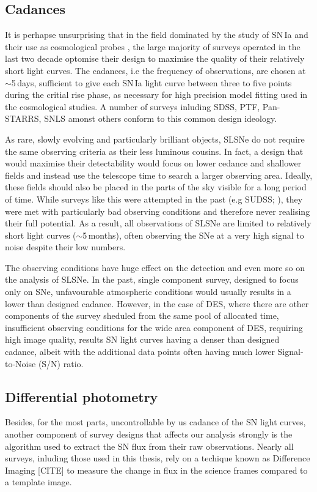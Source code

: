 \subsection{Cadances}
It is perhapse unsurprising that in the field dominated by the study of SN\,Ia and their use as cosmological probes \citep{Perlmutter1997,Riess1998}, the large majority of surveys operated in the last two decade optomise their design to maximise the quality of their relatively short light curves. The cadances, i.e the frequency of observations, are chosen at $\sim$5\,days, sufficient to give each SN\,Ia light curve between three to five points during the critial rise phase, as necessary for high precision model fitting used in the cosmological studies. A number of surveys inluding SDSS, PTF, Pan-STARRS, SNLS amonst others conform to this common design ideology.

As rare, slowly evolving and particularly brilliant objects, SLSNe do not require the same observing criteria as their less luminous cousins. In fact, a design that would maximise their detectability would focus on lower cedance and shallower fields and instead use the telescope time to search a larger observing area. Ideally, these fields should also be placed in the parts of the sky visible for a long period of time. While surveys like this were attempted in the past (e.g SUDSS; ), they were met with particularly bad observing conditions and therefore never realising their full potential. As a result, all observations of SLSNe are limited to relatively short light curves ($\sim$5\,months), often observing the SNe at a very high signal to noise despite their low numbers.

The observing conditions have huge effect on the detection and even more so on the analysis of SLSNe. In the past, single component survey, designed to focus only on SNe, unfavourable atmospheric conditions would usually results in a lower than designed cadance. However, in the case of DES, where there are other components of the survey sheduled from the same pool of allocated time, insufficient observing conditions for the wide area component of DES, requiring high image quality, results SN light curves having a denser than designed cadance, albeit with the additional data points often having much lower Signal-to-Noise (S/N) ratio.

\subsection{Differential photometry}
Besides, for the most parts, uncontrollable by us cadance of the SN light curves, another component of survey designs that affects our analysis strongly is the algorithm used to extract the SN flux from their raw observations. Nearly all surveys, inluding those used in this thesis, rely on a techique known as Difference Imaging [CITE] to measure the change in flux in the science frames compared to a template image.

